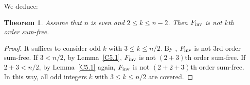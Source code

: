 \documentclass{amsart}
\newtheorem{thm}{Theorem}[section]
\numberwithin{equation}{section}
\theoremstyle{definition}
\newcommand{\f}{\Bbb F}
\newcommand{\fin}{F_{\text{\rm inv}}}
\begin{document}

We deduce:

\begin{thm}\label{T5.1}
Assume that $n$ is even and $2\le k\le n-2$. Then $\fin$ is not $k$th order sum-free.
\end{thm}

\begin{proof}
It suffices to consider odd $k$ with $3\le k\le n/2$. By \cite[Corollary 4]{Carlet-pre}, $\fin$ is not $3$rd order sum-free. If $3<n/2$, by Lemma~\ref{C5.1}, $\fin$ is not $(2+3)$th order sum-free. If $2+3<n/2$, by Lemma~\ref{C5.1} again, $\fin$ is not $(2+2+3)$th order sum-free. In this way, all odd integers $k$ with $3\le k\le n/2$ are covered.
\end{proof}

\end{document}
